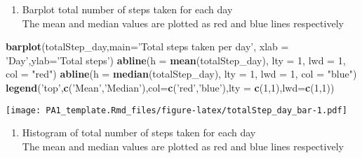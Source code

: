 \documentclass[
]{article}
\newenvironment{Shaded}{\begin{snugshade}}{\end{snugshade}}
\newcommand{\DataTypeTok}[1]{\textcolor[rgb]{0.13,0.29,0.53}{#1}}
\newcommand{\DecValTok}[1]{\textcolor[rgb]{0.00,0.00,0.81}{#1}}
\newcommand{\KeywordTok}[1]{\textcolor[rgb]{0.13,0.29,0.53}{\textbf{#1}}}
\newcommand{\NormalTok}[1]{#1}
\newcommand{\StringTok}[1]{\textcolor[rgb]{0.31,0.60,0.02}{#1}}
\providecommand{\tightlist}{%
  \setlength{\itemsep}{0pt}\setlength{\parskip}{0pt}}
\begin{document}
\begin{enumerate}
\def\labelenumi{\arabic{enumi}.}
\setcounter{enumi}{1}
\tightlist
\item
  Barplot total number of steps taken for each day\\
  The mean and median values are plotted as red and blue lines
  respectively
\end{enumerate}

\begin{Shaded}
\begin{Highlighting}[]
\KeywordTok{barplot}\NormalTok{(totalStep_day,}\DataTypeTok{main=}\StringTok{'Total steps taken per day'}\NormalTok{,}
     \DataTypeTok{xlab =} \StringTok{'Day'}\NormalTok{,}\DataTypeTok{ylab=}\StringTok{'Total steps'}\NormalTok{)}
\KeywordTok{abline}\NormalTok{(}\DataTypeTok{h =} \KeywordTok{mean}\NormalTok{(totalStep_day), }\DataTypeTok{lty =} \DecValTok{1}\NormalTok{, }\DataTypeTok{lwd =} \DecValTok{1}\NormalTok{, }\DataTypeTok{col =} \StringTok{"red"}\NormalTok{)}
\KeywordTok{abline}\NormalTok{(}\DataTypeTok{h =} \KeywordTok{median}\NormalTok{(totalStep_day), }\DataTypeTok{lty =} \DecValTok{1}\NormalTok{, }\DataTypeTok{lwd =} \DecValTok{1}\NormalTok{, }\DataTypeTok{col =} \StringTok{"blue"}\NormalTok{)}
\KeywordTok{legend}\NormalTok{(}\StringTok{'top'}\NormalTok{,}\KeywordTok{c}\NormalTok{(}\StringTok{'Mean'}\NormalTok{,}\StringTok{'Median'}\NormalTok{),}\DataTypeTok{col=}\KeywordTok{c}\NormalTok{(}\StringTok{'red'}\NormalTok{,}\StringTok{'blue'}\NormalTok{),}\DataTypeTok{lty =} \KeywordTok{c}\NormalTok{(}\DecValTok{1}\NormalTok{,}\DecValTok{1}\NormalTok{),}\DataTypeTok{lwd=}\KeywordTok{c}\NormalTok{(}\DecValTok{1}\NormalTok{,}\DecValTok{1}\NormalTok{))}
\end{Highlighting}
\end{Shaded}

\texttt{[image: PA1\_template.Rmd\_files/figure-latex/totalStep\_day\_bar-1.pdf]}

\begin{enumerate}
\def\labelenumi{\arabic{enumi}.}
\setcounter{enumi}{2}
\tightlist
\item
  Histogram of total number of steps taken for each day\\
  The mean and median values are plotted as red and blue lines
  respectively
\end{enumerate}
\end{document}
